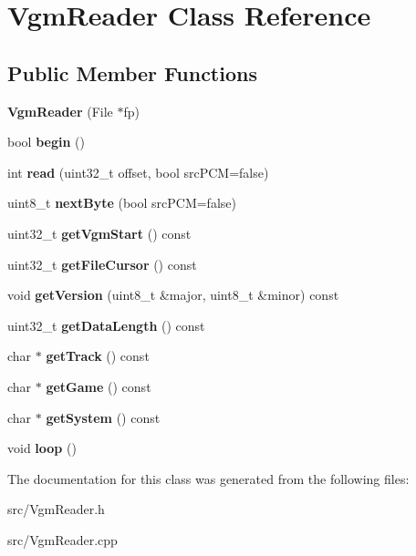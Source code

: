 \hypertarget{classVgmReader}{}\section{Vgm\+Reader Class Reference}
\label{classVgmReader}
\subsection*{Public Member Functions}
\begin{DoxyCompactItemize}
\item 
\mbox{\label{classVgmReader_a263559b8b4047df82ffabb23f9b45e67}} 
{\bfseries Vgm\+Reader} (File $\ast$fp)
\item 
\mbox{\label{classVgmReader_a85918a0bdbde084196ae03c8527cbd65}} 
bool {\bfseries begin} ()
\item 
\mbox{\label{classVgmReader_acf46359505472f61674660a8773be031}} 
int {\bfseries read} (uint32\+\_\+t offset, bool src\+P\+CM=false)
\item 
\mbox{\label{classVgmReader_a918acb2d35cc5e4ba59302ff793f62df}} 
uint8\+\_\+t {\bfseries next\+Byte} (bool src\+P\+CM=false)
\item 
\mbox{\label{classVgmReader_a245775570a9b4352007a7cadbc51a1a9}} 
uint32\+\_\+t {\bfseries get\+Vgm\+Start} () const
\item 
\mbox{\label{classVgmReader_a86954296111af17b768c69b85b0eb32e}} 
uint32\+\_\+t {\bfseries get\+File\+Cursor} () const
\item 
\mbox{\label{classVgmReader_ad515cdc1a020075c36315c99f5c022d0}} 
void {\bfseries get\+Version} (uint8\+\_\+t \&major, uint8\+\_\+t \&minor) const
\item 
\mbox{\label{classVgmReader_adc0453e96dc5214ab57eb51f71f517a0}} 
uint32\+\_\+t {\bfseries get\+Data\+Length} () const
\item 
\mbox{\label{classVgmReader_abaca20e0064d970b589c0a29e5f6e84b}} 
char $\ast$ {\bfseries get\+Track} () const
\item 
\mbox{\label{classVgmReader_a208b143266d376cfbbeb88d4231426fa}} 
char $\ast$ {\bfseries get\+Game} () const
\item 
\mbox{\label{classVgmReader_ac549c1edf3baf9d3ef01f1016e2600d6}} 
char $\ast$ {\bfseries get\+System} () const
\item 
\mbox{\label{classVgmReader_a11003d4f57899f1a8ae006d35976b75d}} 
void {\bfseries loop} ()
\end{DoxyCompactItemize}


The documentation for this class was generated from the following files\+:\begin{DoxyCompactItemize}
\item 
src/Vgm\+Reader.\+h\item 
src/Vgm\+Reader.\+cpp\end{DoxyCompactItemize}
